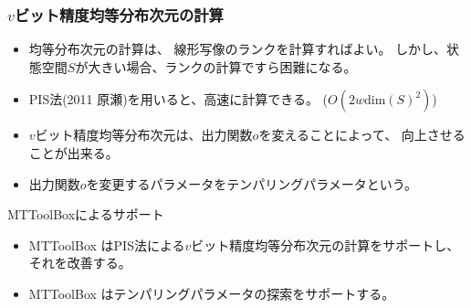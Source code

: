 \documentclass[cjk, dvips, handout, trans, xcolor=dvipsnames]{beamer}
\def\bx{{{\mathbf x}}}
\begin{document}
\begin{frame}[t]
  \frametitle{$v$ビット精度均等分布次元の計算}

  \begin{itemize}
  \item 均等分布次元の計算は、
  線形写像のランクを計算すればよい。
  しかし、状態空間$S$が大きい場合、ランクの計算ですら困難になる。
  \item PIS法\cite{PIS}(2011 原瀬)を用いると、高速に計算できる。
    ($O(2w\mathrm{dim}(S)^2)$)
  \item $v$ビット精度均等分布次元は、出力関数$o$を変えることによって、
    向上させることが出来る。
  \item 出力関数$o$を変更するパラメータをテンパリングパラメータという。
  \end{itemize}

  \begin{block}{MTToolBoxによるサポート}
    \begin{itemize}
    \item MTToolBox はPIS法による$v$ビット精度均等分布次元の計算をサポートし、
      それを改善する。
    \item MTToolBox はテンパリングパラメータの探索をサポートする。
    \end{itemize}
  \end{block}
\end{frame}

\end{document}
